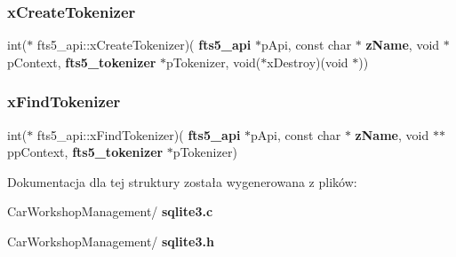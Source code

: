 \mbox{\label{structfts5__api_a6cb9929558ff13c7b5a30292eb5aea7c}} 
\subsubsection{xCreateTokenizer}
{\footnotesize\ttfamily int($\ast$ fts5\+\_\+api\+::x\+Create\+Tokenizer)(\textbf{ fts5\+\_\+api} $\ast$p\+Api, const char $\ast$\textbf{ z\+Name}, void $\ast$p\+Context, \textbf{ fts5\+\_\+tokenizer} $\ast$p\+Tokenizer, void($\ast$x\+Destroy)(void $\ast$))}

\mbox{\label{structfts5__api_aa232f72a0d7c7205fbd0dc6818e24aee}} 
\subsubsection{xFindTokenizer}
{\footnotesize\ttfamily int($\ast$ fts5\+\_\+api\+::x\+Find\+Tokenizer)(\textbf{ fts5\+\_\+api} $\ast$p\+Api, const char $\ast$\textbf{ z\+Name}, void $\ast$$\ast$pp\+Context, \textbf{ fts5\+\_\+tokenizer} $\ast$p\+Tokenizer)}



Dokumentacja dla tej struktury została wygenerowana z plików\+:\begin{DoxyCompactItemize}
\item 
Car\+Workshop\+Management/\textbf{ sqlite3.\+c}\item 
Car\+Workshop\+Management/\textbf{ sqlite3.\+h}\end{DoxyCompactItemize}
